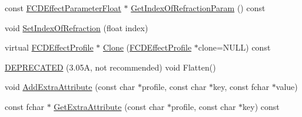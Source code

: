 \begin{DoxyCompactItemize}
\item 
const \hyperlink{classFCDEffectParameterAnimatableT}{FCDEffectParameterFloat} $\ast$ \hyperlink{classFCDEffectStandard_a45c8ea77e71387409eeba9dfd9b54ad7}{GetIndexOfRefractionParam} () const 
\item 
void \hyperlink{classFCDEffectStandard_af60264112cb42d1f00d8b6af09ffc43e}{SetIndexOfRefraction} (float index)
\item 
virtual \hyperlink{classFCDEffectProfile}{FCDEffectProfile} $\ast$ \hyperlink{classFCDEffectStandard_aeadbfb97cdfd733a09a564f457020b66}{Clone} (\hyperlink{classFCDEffectProfile}{FCDEffectProfile} $\ast$clone=NULL) const 
\item 
\hyperlink{classFCDEffectStandard_a40ab2cc34bd3cf5d3f622a8dcf9e9fcd}{DEPRECATED} (3.05A, not recommended) void Flatten()
\item 
void \hyperlink{classFCDEffectStandard_ab7d158f54a2b6d23ed71faa4a3f1598f}{AddExtraAttribute} (const char $\ast$profile, const char $\ast$key, const fchar $\ast$value)
\item 
const fchar $\ast$ \hyperlink{classFCDEffectStandard_a115b0bfdfa3fb1712a51b26607ae8d37}{GetExtraAttribute} (const char $\ast$profile, const char $\ast$key) const 
\end{DoxyCompactItemize}
